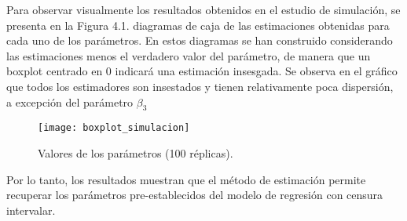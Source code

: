 Para observar visualmente los resultados obtenidos en el estudio de simulación, se presenta en la Figura 4.1. diagramas de caja de las estimaciones obtenidas para cada uno de los parámetros. En estos diagramas se han construido considerando las estimaciones menos el verdadero valor del parámetro, de manera que un boxplot centrado en 0 indicará una estimación insesgada. Se observa en el gráfico que todos los estimadores son insestados y tienen relativamente poca dispersión, a excepción del parámetro $\beta_3$

\begin{figure}[H]
	\texttt{[image: boxplot\_simulacion]}
	\caption{Valores de los parámetros (100 réplicas).}
\end{figure}

Por lo tanto, los resultados muestran que el método de estimación permite recuperar los parámetros pre-establecidos del modelo de regresión con censura intervalar.
